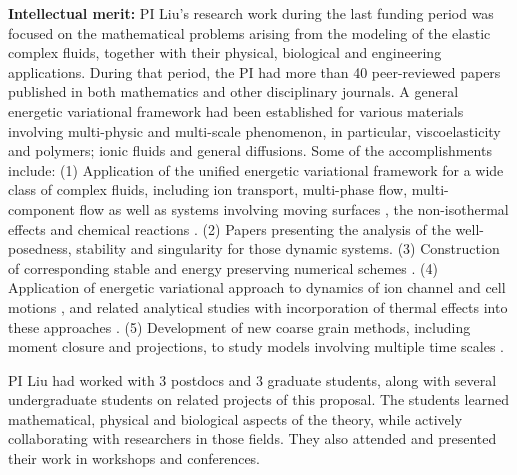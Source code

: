 \documentclass[11pt]{article}
\begin{document}
\noindent\textbf{Intellectual merit:}  
PI Liu's research work during the last funding period was focused on the mathematical problems
arising from the modeling of the elastic complex fluids, together
with their physical, biological and engineering applications.
During that period, the PI had more than 40 peer-reviewed papers published in both mathematics and  other disciplinary journals. A general energetic variational framework had been established for various materials
involving multi-physic and multi-scale phenomenon,  in particular, viscoelasticity and polymers;  ionic fluids and general diffusions.
Some of the accomplishments include: (1) Application of the unified energetic variational framework for a wide class of complex fluids, including ion transport, multi-phase flow,
multi-component flow as well as systems involving moving  surfaces \cite{HuLiLi18,
yang_thermodynamically_2018,benesova_existence_2018, deng_largest_2017,xu_strong_2017,benesova_existence_2018,liu_energetic_2019, Kirshtein2020}, the non-isothermal effects \cite{de2019non,liu2018non, hsieh2020global, Jan-Eric}
and chemical reactions \cite{terebus2018discrete, wang2020field}. 
(2) Papers \cite{liu_energetic_2019, epshteyn2019large, Jan-Eric, hsieh2020global} presenting the analysis of the well-posedness, stability and singularity
for those dynamic systems. (3) Construction of corresponding stable and energy preserving numerical schemes \cite{duan_numerical_2019,xu_numerical_2019,duan_numerical_2019-2, wu2019energetic, liu2020lagrangian, liu2020variational, liu2020structure,duan2020structure}.
 (4)  Application of energetic variational approach to dynamics of ion channel and cell motions \cite{horng_continuum_2019,gavish_bistable_2018, liu_generalized_2017},
and related analytical studies \cite{WaLiTa17, hsieh2020global} with incorporation of thermal effects into these approaches \cite{liu2018non, wu2019energetic, hsieh2020global}.  (5) Development of new coarse grain  methods, including moment closure and projections, to study models involving multiple time scales
\cite{ma_fluctuation-dissipation_2017,ma_coarse-graining_2019}.


  PI Liu had worked with
3 postdocs and 3 graduate students, along with several undergraduate students 
on related projects of this proposal. 
The students learned mathematical, physical and biological
aspects of the theory, while actively collaborating  with researchers in those fields.
They also attended and presented their work in workshops and conferences.
\end{document}
